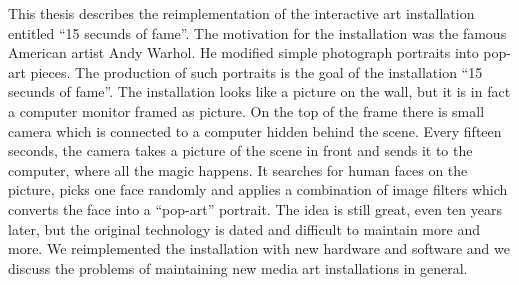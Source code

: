 This thesis describes the reimplementation of the interactive art installation
entitled ``15 secunds of fame''. The motivation for the installation was the
famous American artist Andy Warhol. He modified simple photograph portraits
into pop-art pieces. The production of such portraits is the goal of the
installation ``15 secunds of fame''. The installation looks like a picture on
the wall, but it is in fact a computer monitor framed as picture. On the top
of the frame there is small camera which is connected to a computer hidden
behind the scene. Every fifteen seconds, the camera takes a picture of the
scene in front and sends it to the computer, where all the magic happens. It
searches for human faces on the picture, picks one face randomly and applies a
combination of image filters which converts the face into a ``pop-art''
portrait. The idea is still great, even ten years later, but the original
technology is dated and difficult to maintain more and more. We reimplemented
the installation with new hardware and software and we discuss the problems of
maintaining new media art installations in general.
